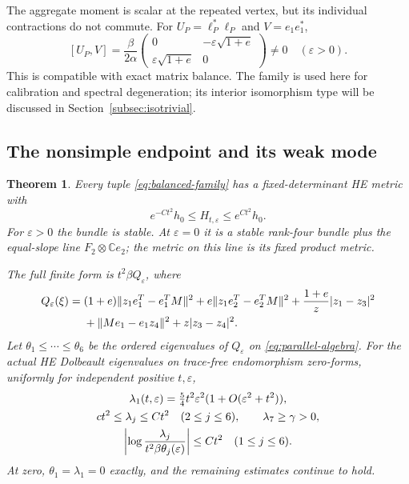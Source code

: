 \documentclass[11pt]{amsart}
\newtheorem{theorem}{Theorem}[section]
\theoremstyle{definition}
\theoremstyle{remark}
\newcommand{\CC}{\mathbb C}
\begin{document}
The aggregate moment is scalar at the repeated vertex, but its individual
contractions do not commute. For $U_P=\ell_P^*\ell_P$ and
$V=e_1e_1^*$,
\begin{equation}\label{eq:balanced-commutator}
 [U_P,V]=\frac\beta{2\alpha}
 \begin{pmatrix}0&-\varepsilon\sqrt{1+e}\\
                 \varepsilon\sqrt{1+e}&0\end{pmatrix}\ne0
 \quad(\varepsilon>0).
\end{equation}
This is compatible with exact matrix balance. The family is used here
for calibration and spectral degeneration; its interior isomorphism
type will be discussed in Section~\ref{subsec:isotrivial}.

\subsection{The nonsimple endpoint and its weak mode}
\begin{theorem}\label{thm:balanced-spectrum}
Every tuple \eqref{eq:balanced-family} has a fixed-determinant HE
metric with
\begin{equation}\label{eq:balanced-he}
 e^{-Ct^2}h_0\le H_{t,\varepsilon}\le e^{Ct^2}h_0.
\end{equation}
For $\varepsilon>0$ the bundle is stable. At $\varepsilon=0$ it is
a stable rank-four bundle plus the equal-slope line $F_2\otimes\CC e_2$;
the metric on this line is its fixed product metric.

The full finite form is $t^2\beta Q_\varepsilon$, where
\begin{align}
 Q_\varepsilon(\xi)={}&(1+e)\|z_1e_1^T-e_1^TM\|^2
 +e\|z_1e_2^T-e_2^TM\|^2
 +\frac{1+e}{z}|z_1-z_3|^2\notag\\
 &+\|Me_1-e_1z_4\|^2+z|z_3-z_4|^2.
 \label{eq:balanced-finite-form}
\end{align}
Let $\theta_1\le\cdots\le\theta_6$ be the ordered eigenvalues of
$Q_\varepsilon$ on
\eqref{eq:parallel-algebra}. For the actual HE Dolbeault eigenvalues
on trace-free endomorphism zero-forms,
uniformly for independent positive $t,\varepsilon$,
\begin{gather}
 \lambda_1(t,\varepsilon)=\tfrac54t^2\varepsilon^2
                (1+O(\varepsilon^2+t^2)),\label{eq:balanced-weak-law}\\
 ct^2\le\lambda_j\le Ct^2\quad(2\le j\le6),\qquad
 \lambda_7\ge\gamma>0,\notag\\
 \left|\log\frac{\lambda_j}{t^2\beta\theta_j(\varepsilon)}\right|
 \le Ct^2\quad(1\le j\le6).\notag
\end{gather}
At zero, $\theta_1=\lambda_1=0$ exactly, and the remaining estimates
continue to hold.
\end{theorem}
\end{document}
